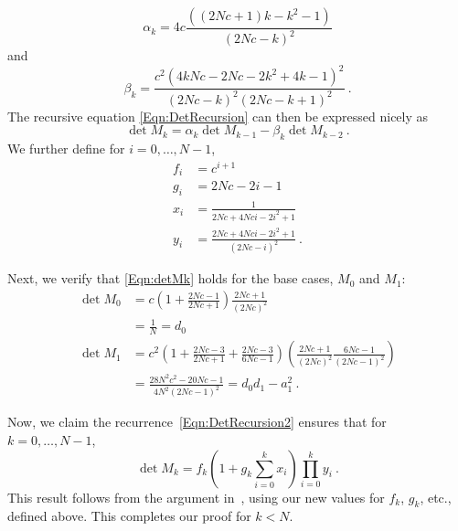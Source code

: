 \documentclass[11pt]{article}
\numberwithin{equation}{section}
\theoremstyle{definition}
\theoremstyle{definition}
\theoremstyle{definition}
\newcommand{\1}{\mathbf{1}}
\newcommand{\detDenom}[1]{2N{#1}+4N{#1}i-2i^2+1}
\begin{document}
    \begin{equation}
    \alpha_k = 4c\frac{\left((2Nc+1)k - k^2-1 \right)}{(2Nc-k)^2}
    \end{equation}
    and
    \begin{equation}
    \beta_k = \frac{c^2\left(4kNc-2Nc-2k^2 +4k- 1\right)^2}{(2Nc-k)^2(2Nc-k+1)^2} \ .
    \end{equation}
    The recursive equation \eqref{Eqn:DetRecursion} can then be expressed nicely as
    \begin{equation}\label{Eqn:DetRecursion2}
    \det M_k = \alpha_k \det M_{k-1} - \beta_k \det M_{k-2} \ .
    \end{equation}
    We further define for $i=0,\dots, N-1$,
    \begin{align*}
    f_i & = c^{i+1} \\
    g_i & = 2Nc-2i-1 \\
    x_i & = \frac{1}{\detDenom{c}} \\
    y_i & = \frac{\detDenom{c}}{(2Nc-i)^2} \ . 
    \end{align*}
    
    Next, we verify that \eqref{Eqn:detMk} holds for the base cases, $M_0$ and $M_1$:
    \begin{align*}
    \det M_0 &= c\left(1+\frac{2Nc-1}{2Nc+1}\right) \frac{2Nc+1}{(2Nc)^2} \\
     & = \frac{1}{N} = d_0\\
     \det M_1 &= c^2\left(1+ \frac{2Nc-3}{2Nc+1} + \frac{2Nc-3}{6Nc-1}\right) \left( \frac{2Nc+1}{(2Nc)^2} \frac{6Nc-1}{(2Nc-1)^2} \right) \\
    & = \frac{28N^2c^2-20Nc-1}{4N^2(2Nc-1)^2} = d_0d_1 - a_1^2 \ .
    \end{align*}
    
    Now, we claim the recurrence~\eqref{Eqn:DetRecursion2} ensures that for $k=0,\dots,N-1$,
    \begin{equation*}
    \det M_k = f_k\left(1+g_k\sum_{i=0}^{k} x_i\right) \prod_{i=0}^k y_i \ .
    \end{equation*}
    This result follows from the argument in~\cite[Lemma 3.3]{FirstPEP}, using our new values for $f_k$, $g_k$, etc., defined above. This completes our proof for $k<N$.
    
\end{document}
